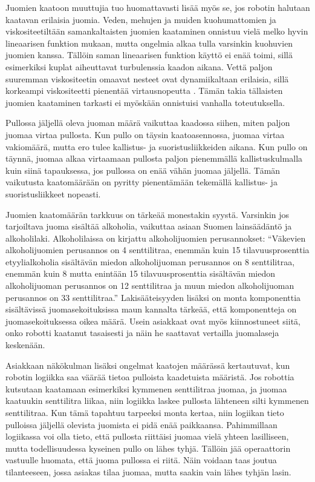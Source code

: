 Juomien kaatoon muuttujia tuo huomattavasti lisää myös se, jos robotin halutaan kaatavan erilaisia juomia. Veden, mehujen ja muiden kuohumattomien ja viskositeetiltään samankaltaisten juomien kaataminen onnistuu vielä melko hyvin lineaarisen funktion mukaan, mutta ongelmia alkaa tulla varsinkin kuohuvien juomien kanssa. Tällöin saman lineaarisen funktion käyttö ei enää toimi, sillä esimerkiksi kuplat aiheuttavat turbulenssia kaadon aikana. Vettä paljon suuremman viskositeetin omaavat nesteet ovat dynamiikaltaan erilaisia, sillä korkeampi viskositeetti pienentää virtausnopeutta \cite{Lumen2021}. Tämän takia tällaisten juomien kaataminen tarkasti ei myöskään onnistuisi vanhalla toteutuksella.

Pullossa jäljellä oleva juoman määrä vaikuttaa kaadossa siihen, miten paljon juomaa virtaa pullosta. Kun pullo on täysin kaatoasennossa, juomaa virtaa vakiomäärä, mutta ero tulee kallistus- ja suoristusliikkeiden aikana. Kun pullo on täynnä, juomaa alkaa virtaamaan pullosta paljon pienemmällä kallistuskulmalla kuin siinä tapauksessa, jos pullossa on enää vähän juomaa jäljellä. Tämän vaikutusta kaatomäärään on pyritty pienentämään tekemällä kallistus- ja suoristusliikkeet nopeasti.

Juomien kaatomäärän tarkkuus on tärkeää monestakin syystä. Varsinkin jos tarjoiltava juoma sisältää alkoholia, vaikuttaa asiaan Suomen lainsäädäntö ja alkoholilaki. Alkoholilaissa on kirjattu alkoholijuomien perusannokset: ``Väkevien alkoholijuomien perusannos on 4 senttilitraa, enemmän kuin 15 tilavuusprosenttia etyylialkoholia sisältävän miedon alkoholijuoman perusannos on 8 senttilitraa, enemmän kuin 8 mutta enintään 15 tilavuusprosenttia sisältävän miedon alkoholijuoman perusannos on 12 senttilitraa ja muun miedon alkoholijuoman perusannos on 33 senttilitraa.'' \cite{Finlex} Lakisääteisyyden lisäksi on monta komponenttia sisältävissä juomasekoituksissa maun kannalta tärkeää, että komponentteja on juomasekoituksessa oikea määrä. Usein asiakkaat ovat myös kiinnostuneet siitä, onko robotti kaatanut tasaisesti ja näin he saattavat vertailla juomalaseja keskenään.

Asiakkaan näkökulman lisäksi ongelmat kaatojen määrässä kertautuvat, kun robotin logiikka saa väärää tietoa pulloista kaadetuista määristä. Jos robottia kutsutaan kaatamaan esimerkiksi kymmenen senttilitraa juomaa, ja juomaa kaatuukin senttilitra liikaa, niin logiikka laskee pullosta lähteneen silti kymmenen senttilitraa. Kun tämä tapahtuu tarpeeksi monta kertaa, niin logiikan tieto pulloissa jäljellä olevista juomista ei pidä enää paikkaansa. Pahimmillaan logiikassa voi olla tieto, että pullosta riittäisi juomaa vielä yhteen lasilliseen, mutta todellisuudessa kyseinen pullo on lähes tyhjä. Tällöin jää operaattorin vastuulle huomata, että juoma pullossa ei riitä. Näin voidaan taas joutua tilanteeseen, jossa asiakas tilaa juomaa, mutta saakin vain lähes tyhjän lasin.

